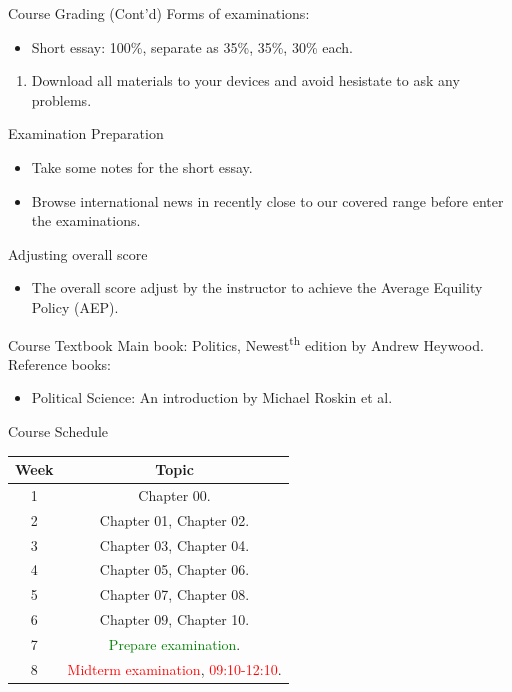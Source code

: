\documentclass{beamer}
\begin{document}
\begin{frame}{Course Grading (Cont'd)}
Forms of examinations:
\begin{itemize}
\item Short essay: 100\%, separate as 35\%, 35\%, 30\% each.
\end{itemize}
\begin{enumerate}
\item Download all materials to your devices and avoid hesistate to ask any problems.
\end{enumerate}
\end{frame}
\begin{frame}{Examination Preparation}
\begin{itemize}
\item Take some notes for the short essay.
\item Browse international news in recently close to our covered range before enter the examinations.
\end{itemize}
\begin{block}{Adjusting overall score}
\begin{itemize}
\item The overall score adjust by the instructor to achieve the Average Equility Policy (AEP).
\end{itemize}
\end{block}
\end{frame}
\begin{frame}{Course Textbook}
Main book: Politics, Newest\textsuperscript{th} edition by Andrew Heywood. \\
Reference books:
\begin{itemize}
\item Political Science: An introduction by Michael Roskin et al.
\end{itemize}
\end{frame}
\begin{frame}{Course Schedule}
\begin{center}
\begin{tabular}{|c|c|}
\hline
Week & Topic \\
\hline
1 & Chapter 00.\\
\hline
2 & Chapter 01, Chapter 02.\\
\hline
3 & Chapter 03, Chapter 04.\\
\hline
4 & Chapter 05, Chapter 06.\\
\hline
5 & Chapter 07, Chapter 08.\\
\hline
6 & Chapter 09, Chapter 10.\\
\hline
7 & \textcolor{Green}{Prepare examination}.\\
\hline
8 & \textcolor{red}{Midterm examination}, \textcolor{red}{09:10-12:10}.\\
\hline
\end{tabular}
\end{center}
\end{frame}
\end{document}
